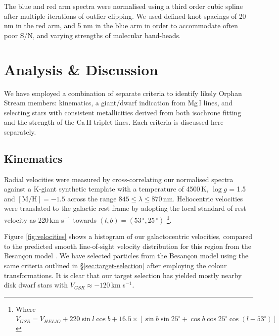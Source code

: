 \documentclass[10pt,apjl]{emulateapj}
\begin{document}
The blue and red arm spectra were normalised using a third order cubic spline after multiple iterations of outlier clipping. We used defined knot spacings of 20 nm in the red arm, and 5 nm in the blue arm in order to accommodate often poor S/N, and varying strengths of molecular band-heads.

\section{Analysis \& Discussion}
\label{sec:analysis}

We have employed a combination of separate criteria to identify likely Orphan Stream members: kinematics, a giant/dwarf indication from Mg\,\textsc{I} lines, and selecting stars with consistent metallicities derived from both isochrone fitting and the strength of the Ca\,\textsc{II} triplet lines. Each criteria is discussed here separately.

\subsection{Kinematics}
Radial velocities were measured by cross-correlating our normalised spectra against a K-giant synthetic template with a temperature of 4500\,K, $\log{g}$ = 1.5 and $[\mbox{M/H}] = -1.5$ across the range $845 \leq \lambda \leq 870$\,nm. Heliocentric velocities were translated to the galactic rest frame by adopting the local standard of rest velocity as 220\,km s$^{-1}$ towards $(l, b) = (53\,^\circ, 25\,^\circ)$ \citep{Kerr_Lynden-Bell_1986, Mihalas_Binney_1981}\footnote{Where $V_{GSR} = V_{HELIO} + 220\sin{l}\cos{b} + 16.5\times[\sin{b}\sin{25^\circ} + \cos{b}\cos{25^\circ}\cos{(l - 53^\circ)}]$}.

Figure \ref{fig:velocities} shows a histogram of our galactocentric velocities, compared to the predicted smooth line-of-sight velocity distribution for this region from the Besan\c{c}on model \citep{Robin_et-al_2003}. We have selected particles from the Besan\c{c}on model using the same criteria outlined in \S\ref{sec:target-selection} after employing the \citet{Jordi_et-al_2006} colour transformations. It is clear that our target selection has yielded mostly nearby disk dwarf stars with $V_{GSR} \approx -120$\,km s$^{-1}$.
\end{document}
